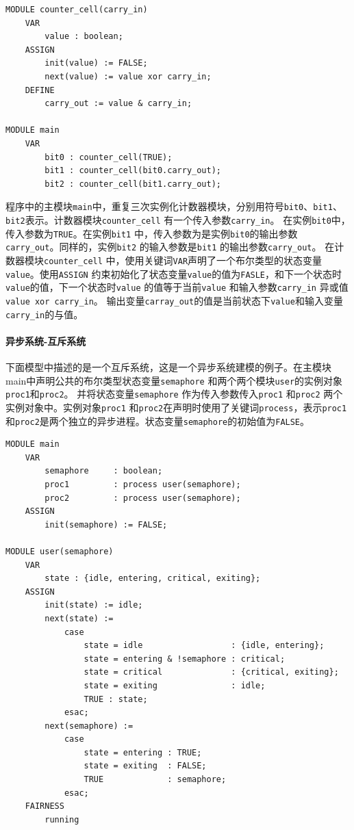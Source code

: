 \begin{lstlisting}
MODULE counter_cell(carry_in)
    VAR
        value : boolean;
    ASSIGN
        init(value) := FALSE;
        next(value) := value xor carry_in;
    DEFINE
        carry_out := value & carry_in;

MODULE main
    VAR
        bit0 : counter_cell(TRUE);
        bit1 : counter_cell(bit0.carry_out);
        bit2 : counter_cell(bit1.carry_out);
\end{lstlisting}

程序中的主模块\verb|main|中，重复三次实例化计数器模块，分别用符号\verb|bit0|、\verb|bit1|、\verb|bit2|表示。计数器模块\verb|counter_cell| 有一个传入参数\verb|carry_in|。 在实例\verb|bit0|中，传入参数为\verb|TRUE|。在实例\verb|bit1| 中，传入参数为是实例\verb|bit0|的输出参数\verb|carry_out|。同样的，实例\verb|bit2| 的输入参数是\verb|bit1| 的输出参数\verb|carry_out|。 在计数器模块\verb|counter_cell| 中，使用关键词\verb|VAR|声明了一个布尔类型的状态变量\verb|value|。使用\verb|ASSIGN| 约束初始化了状态变量\verb|value|的值为\verb|FASLE|，和下一个状态时\verb|value|的值，下一个状态时\verb|value| 的值等于当前\verb|value| 和输入参数\verb|carry_in| 异或值\verb|value xor carry_in|。 输出变量\verb|carray_out|的值是当前状态下\verb|value|和输入变量\verb|carry_in|的与值。

\paragraph{异步系统-互斥系统}
下面模型中描述的是一个互斥系统，这是一个异步系统建模的例子。在主模块main中声明公共的布尔类型状态变量\verb|semaphore| 和两个两个模块\verb|user|的实例对象\verb|proc1|和\verb|proc2|。 并将状态变量\verb|semaphore| 作为传入参数传入\verb|proc1| 和\verb|proc2| 两个实例对象中。实例对象\verb|proc1| 和\verb|proc2|在声明时使用了关键词\verb|process|，表示\verb|proc1| 和\verb|proc2|是两个独立的异步进程。状态变量\verb|semaphore|的初始值为\verb|FALSE|。

\begin{lstlisting}
MODULE main
    VAR
        semaphore     : boolean;
        proc1         : process user(semaphore);
        proc2         : process user(semaphore);
    ASSIGN
        init(semaphore) := FALSE;

MODULE user(semaphore)
    VAR
        state : {idle, entering, critical, exiting};
    ASSIGN
        init(state) := idle;
        next(state) :=
            case
                state = idle                  : {idle, entering};
                state = entering & !semaphore : critical;
                state = critical              : {critical, exiting};
                state = exiting               : idle;
                TRUE : state;
            esac;
        next(semaphore) :=
            case
                state = entering : TRUE;
                state = exiting  : FALSE;
                TRUE             : semaphore;
            esac;
    FAIRNESS
        running
\end{lstlisting}

